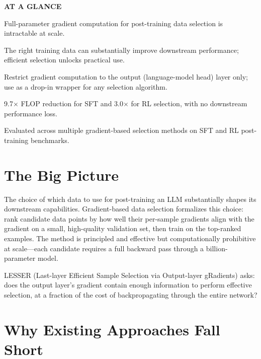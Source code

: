 \documentclass[10pt,twocolumn]{article}
\begin{document}
\begin{mdframed}[backgroundcolor=boxgray,linecolor=rulered,linewidth=1pt,
    innerleftmargin=6pt,innerrightmargin=6pt,
    innertopmargin=6pt,innerbottommargin=6pt]
\textbf{\small AT A GLANCE}\par\vspace{4pt}
\begin{description}[leftmargin=0pt,labelsep=4pt,itemsep=2pt,parsep=0pt,
    font=\small\bfseries]
  \item[Problem:] Full-parameter gradient computation for post-training data
    selection is intractable at scale.
  \item[Why it matters:] The right training data can substantially improve
    downstream performance; efficient selection unlocks practical use.
  \item[Method:] Restrict gradient computation to the output (language-model
    head) layer only; use as a drop-in wrapper for any selection algorithm.
  \item[Result:] 9.7$\times$ FLOP reduction for SFT and 3.0$\times$ for RL
    selection, with no downstream performance loss.
  \item[Evidence:] Evaluated across multiple gradient-based selection methods
    on SFT and RL post-training benchmarks.
\end{description}
\end{mdframed}

\section{The Big Picture}

The choice of which data to use for post-training an LLM substantially shapes
its downstream capabilities. Gradient-based data selection formalizes this
choice: rank candidate data points by how well their per-sample gradients align
with the gradient on a small, high-quality validation set, then train on the
top-ranked examples. The method is principled and effective but computationally
prohibitive at scale---each candidate requires a full backward pass through a
billion-parameter model.

LESSER (Last-layer Efficient Sample Selection via Output-layer gRadients) asks:
does the output layer's gradient contain enough information to perform
effective selection, at a fraction of the cost of backpropagating through
the entire network?

\section{Why Existing Approaches Fall Short}
\end{document}
